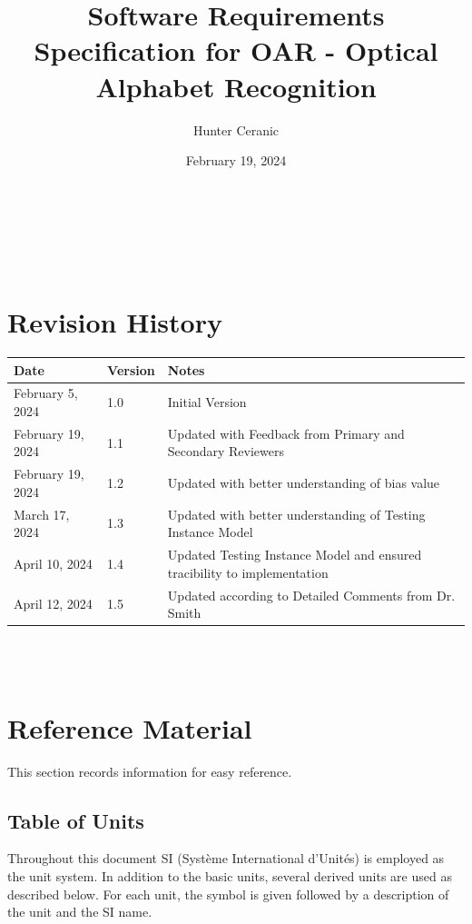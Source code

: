 \documentclass[12pt]{article}
\begin{document}
\title{Software Requirements Specification for OAR - Optical Alphabet Recognition} 
\author{Hunter Ceranic}
\date{February 19, 2024}
	
\maketitle

~\newpage


\tableofcontents

~\newpage

\section*{Revision History}

\begin{tabularx}{\textwidth}{p{3cm}p{2cm}X}
\toprule {\bf Date} & {\bf Version} & {\bf Notes}\\
\midrule
February 5, 2024 & 1.0 & Initial Version\\
February 19, 2024 & 1.1 & Updated with Feedback from Primary and Secondary Reviewers\\
February 19, 2024 & 1.2 & Updated with better understanding of bias value\\
March 17, 2024 & 1.3 & Updated with better understanding of Testing Instance Model\\
April 10, 2024 & 1.4 & Updated Testing Instance Model and ensured tracibility to implementation\\
April 12, 2024 & 1.5 & Updated according to Detailed Comments from Dr. Smith\\
\bottomrule
\end{tabularx}

~\\

~\newpage

\section{Reference Material}

This section records information for easy reference.

\subsection{Table of Units}

Throughout this document SI (Syst\`{e}me International d'Unit\'{e}s) is employed
as the unit system.  In addition to the basic units, several derived units are
used as described below.  For each unit, the symbol is given followed by a
description of the unit and the SI name.
~\newline
\end{document}
